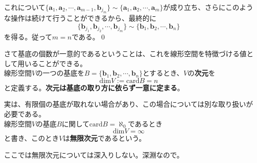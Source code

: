 \documentclass[dvipdfmx]{jsarticle}
\begin{document}
これについて$\{\bm{a}_1,\bm{a}_2,\cdots,\bm{a}_{m-1},\bm{b}_{j_m}\}\sim\{\bm{a}_1,\bm{a}_2,\cdots,\bm{a}_m\}$が成り立ち、さらにこのような操作は続けて行うことができるから、最終的に
\[\{\bm{b}_{j_1},\bm{b}_{j_2},\cdots,\bm{b}_{j_m}\}\sim\{\bm{b}_1,\bm{b}_2,\cdots,\bm{b}_n\}\]
を得る。従って$m=n$である。\qed\\\par
さて基底の個数が一意的であるということは、これを線形空間を特徴づける値として用いることができる。\\
線形空間$V$の一つの基底を$B=\{\bm{b}_1,\bm{b}_2,\cdots,\bm{b}_n\}$とするとき、$V$の\textbf{次元}を
\[\mathrm{dim}V:=\mathrm{card}B=n\]
と定義する。\textbf{次元は基底の取り方に依らず一意に定まる}。\\\par
実は、有限個の基底が取れない場合があり、この場合については別な取り扱いが必要である。\\
線形空間$V$の基底$B$に関して$\mathrm{card}B=\aleph_0$であるとき
\[\mathrm{dim}V=\infty\]
と書き、このとき$V$は\textbf{無限次元}であるという。\\\par
ここでは無限次元については深入りしない。深淵なので。
\end{document}
